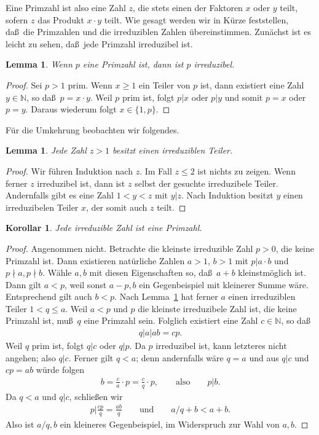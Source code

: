 \documentclass[10pt,reqno]{amsart}
\numberwithin{equation}{section}
\newcommand\NN{\mathbb N}
\newtheorem{lemma}[definition]{Lemma}
\newtheorem{corollary}[definition]{Korollar}
\newcommand\Lem{Lemma}
\begin{document}
Eine Primzahl ist also eine Zahl $z$, die stets einen der Faktoren $x$ oder $y$ teilt, sofern $z$ das Produkt $x\cdot y$ teilt.
Wie gesagt werden wir in K\"urze feststellen, da\ss\ die Primzahlen und die irreduziblen Zahlen \"ubereinstimmen.
Zun\"achst ist es leicht zu sehen, da\ss\ jede Primzahl irreduzibel ist.

\begin{lemma}\label{lem_prime1}
	Wenn $p$ eine Primzahl ist, dann ist $p$ irreduzibel.
\end{lemma}
\begin{proof}
	Sei $p>1$ prim.
	Wenn $x\geq1$ ein Teiler von $p$ ist, dann existiert eine Zahl $y\in\NN$, so da\ss\ $p=x\cdot y$.
	Weil $p$ prim ist, folgt $p|x$ oder $p|y$ und somit $p=x$ oder $p=y$.
	Daraus wiederum folgt $x\in\{1,p\}$.
\end{proof}

F\"ur die Umkehrung beobachten wir folgendes.

\begin{lemma}\label{lem_irred}
	Jede Zahl $z>1$ besitzt einen irreduziblen Teiler.
\end{lemma}
\begin{proof}
	Wir f\"uhren Induktion nach $z$.
	Im Fall $z\leq2$ ist nichts zu zeigen.
	Wenn ferner $z$ irreduzibel ist, dann ist $z$ selbst der gesuchte irreduzibele Teiler.
	Andernfalls gibt es eine Zahl $1<y<z$ mit $y|z$.
	Nach Induktion besitzt $y$ einen irreduzibelen Teiler $x$, der somit auch $z$ teilt.
\end{proof}

\begin{corollary}\label{cor_irred}
	Jede irreduzible Zahl ist eine Primzahl.
\end{corollary}
\begin{proof}
	Angenommen nicht.
	Betrachte die kleinste irreduzible Zahl $p>0$, die keine Primzahl ist.
	Dann existieren nat\"urliche Zahlen $a>1$, $b>1$ mit $p|a\cdot b$ und $p\nmid a,p\nmid b$.
	W\"ahle $a,b$ mit diesen Eigenschaften so, da\ss\ $a+b$ kleinstm\"oglich ist.
	Dann gilt $a<p$, weil sonst $a-p,b$ ein Gegenbeispiel mit kleinerer Summe w\"are.
	Entsprechend gilt auch $b<p$.
	Nach \Lem~\ref{lem_irred} hat ferner $a$ einen irreduziblen Teiler $1<q\leq a$.
	Weil $a<p$ und $p$ die kleinste irreduzibele Zahl ist, die keine Primzahl ist, mu\ss\ $q$ eine Primzahl sein.
	Folglich existiert eine Zahl $c\in\NN$, so da\ss
	\begin{align*}
		q|a|ab=cp.
	\end{align*}
	Weil $q$ prim ist, folgt $q|c$ oder $q|p$.
	Da $p$ irreduzibel ist, kann letzteres nicht angehen; also $q|c$.
	Ferner gilt $q<a$; denn andernfalls w\"are $q=a$ und aus $q|c$ und $cp=ab$ w\"urde folgen
	\begin{align*}
		b=\frac ca\cdot p=\frac cq\cdot p,\qquad\mbox{also}\qquad p|b.
	\end{align*}
	Da $q<a$ und $q|c$, schlie\ss en wir
	\begin{align*}
		p|\frac{cp}q=\frac{ab}q\qquad\mbox{und}\qquad a/q+b<a+b.
	\end{align*}
	Also ist $a/q,b$ ein kleineres Gegenbeispiel, im Widerspruch zur Wahl von $a,b$.
\end{proof}
\end{document}
